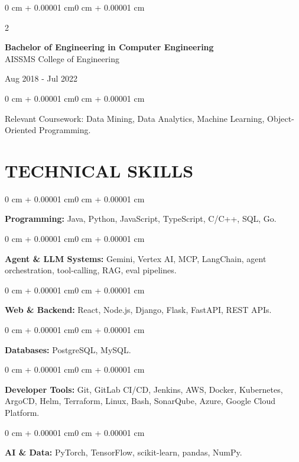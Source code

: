 \documentclass[10pt, letterpaper]{article}
\newenvironment{onecolentry}{
    \begin{adjustwidth}{0 cm + 0.00001 cm}{0 cm + 0.00001 cm}
}{
    \end{adjustwidth}
}
\newenvironment{twocolentry}[2][]{
    \onecolentry
    \def\secondColumn{#2}
    \setcolumnwidth{\fill, 4.5 cm}
    \begin{paracol}{2}
}{
    \switchcolumn \raggedleft \secondColumn
    \end{paracol}
    \endonecolentry
}
\begin{document}
\begin{twocolentry}{
    Aug 2018 - Jul 2022
}
    \textbf{Bachelor of Engineering in Computer Engineering} \\
    AISSMS College of Engineering
\end{twocolentry}
\begin{onecolentry}
Relevant Coursework: Data Mining, Data Analytics, Machine Learning, Object-Oriented Programming.
\end{onecolentry}
\section{TECHNICAL SKILLS}
\begin{onecolentry}
\textbf{Programming:} Java, Python, JavaScript, TypeScript, C/C++, SQL, Go.
\end{onecolentry}
\vspace{0.06 cm}
\begin{onecolentry}
\textbf{Agent \& LLM Systems:} Gemini, Vertex AI, MCP, LangChain, agent orchestration, tool-calling, RAG, eval pipelines.
\end{onecolentry}
\vspace{0.06 cm}
\begin{onecolentry}
\textbf{Web \& Backend:} React, Node.js, Django, Flask, FastAPI, REST APIs.
\end{onecolentry}
\vspace{0.06 cm}
\begin{onecolentry}
\textbf{Databases:} PostgreSQL, MySQL.
\end{onecolentry}
\vspace{0.06 cm}
\begin{onecolentry}
\textbf{Developer Tools:} Git, GitLab CI/CD, Jenkins, AWS, Docker, Kubernetes, ArgoCD, Helm, Terraform, Linux, Bash, SonarQube, Azure, Google Cloud Platform.
\end{onecolentry}
\vspace{0.06 cm}
\begin{onecolentry}
\textbf{AI \& Data:} PyTorch, TensorFlow, scikit-learn, pandas, NumPy.
\end{onecolentry}

\end{document}
